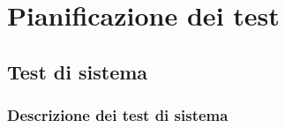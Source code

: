 \newpage
\section{Pianificazione dei test}
\subsection{Test di sistema}
\subsubsection{Descrizione dei test di sistema}



